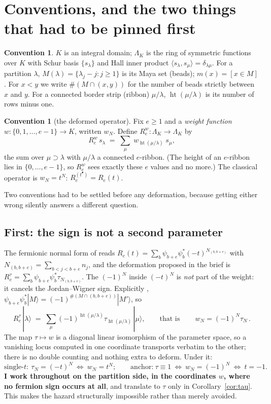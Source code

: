 \documentclass[11pt]{article}
\theoremstyle{definition}
\newtheorem{convention}[theorem]{Convention}
\newcommand{\hgt}{\operatorname{ht}}   %
\newcommand{\Lam}{\Lambda}
\begin{document}
\section{Conventions, and the two things that had to be pinned first}

\begin{convention}\label{conv:main}
$K$ is an integral domain; $\Lam_K$ is the ring of symmetric functions over $K$ with
Schur basis $\{s_\lambda\}$ and Hall inner product $\langle s_\lambda,s_\mu\rangle=
\delta_{\lambda\mu}$.  For a partition $\lambda$, $M(\lambda)=\{\lambda_j-j:j\ge1\}$ is
its Maya set (beads); $m(x)=[x\in M]$.  For $x<y$ we write
$\#(M\cap(x,y))$ for the number of beads strictly between $x$ and $y$.
For a connected border strip (ribbon) $\mu/\lambda$, $\hgt(\mu/\lambda)$ is its number of
rows minus one.
\end{convention}

\begin{convention}[the deformed operator]\label{conv:def}
Fix $e\ge1$ and a \emph{weight function} $w:\{0,1,\dots,e-1\}\to K$, written $w_N$.
Define $R_e^{w}:\Lam_K\to\Lam_K$ by
\[
   R_e^{w}\,s_\lambda\;=\;\sum_{\mu}\;w_{\hgt(\mu/\lambda)}\;s_\mu ,
\]
the sum over $\mu\supset\lambda$ with $\mu/\lambda$ a connected $e$-ribbon.  (The height
of an $e$-ribbon lies in $\{0,\dots,e-1\}$, so $R_e^w$ sees exactly these $e$ values and
no more.)  The classical operator is $w_N=t^{N}$:  $R_e^{(t^\bullet)}=R_e(t)$.
\end{convention}

Two conventions had to be settled before any deformation, because getting either wrong
silently answers a different question.

\subsection*{First: the sign is not a second parameter}

The fermionic normal form of \cite{Clio0906} reads
$R_e(t)=\sum_{b}\psi_{b+e}\psi_b^{*}(-t)^{N_{(b,b+e)}}$ with
$N_{(b,b+e)}=\sum_{b<j<b+e}n_j$, and the deformation proposed in the brief is
$R_e^{\tau}=\sum_b\psi_{b+e}\psi_b^{*}\tau_{N_{(b,b+e)}}$.  The $(-1)^N$ inside $(-t)^N$
is \emph{not} part of the weight: it cancels the Jordan--Wigner sign.  Explicitly
\cite[Lem.~5]{Clio0906},
$\psi_{b+e}\psi_b^{*}|M\rangle=(-1)^{\#(M\cap(b,b+e))}|M'\rangle$, so
\[
   R_e^{\tau}\,|\lambda\rangle
   \;=\;\sum_{\mu}(-1)^{\hgt(\mu/\lambda)}\tau_{\hgt(\mu/\lambda)}\,|\mu\rangle ,
   \qquad\text{that is}\qquad
   \boxed{\,w_N=(-1)^N\tau_N\,}.
\]
The map $\tau\mapsto w$ is a diagonal linear isomorphism of the parameter space, so a
vanishing locus computed in one coordinate transports verbatim to the other; there is no
double counting and nothing extra to deform.  Under it:
\[
 \text{single-}t:\ \tau_N=(-t)^N\ \Longleftrightarrow\ w_N=t^N;\qquad
 \text{anchor:}\ \tau\equiv1\ \Longleftrightarrow\ w_N=(-1)^N\ \Longleftrightarrow\ t=-1 .
\]
\textbf{I work throughout on the partition side, in the coordinates $w$, where no fermion
sign occurs at all}, and translate to $\tau$ only in Corollary~\ref{cor:tau}.  This makes
the hazard structurally impossible rather than merely avoided.
\end{document}
